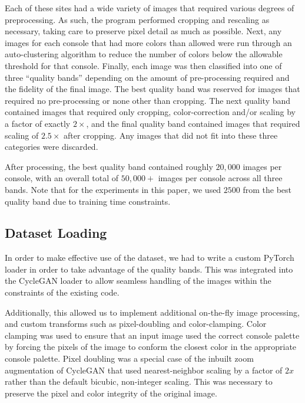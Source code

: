 \documentclass[10pt,twocolumn,letterpaper]{article}
\begin{document}
Each of these sites had a wide variety of images that required various degrees of preprocessing. As such, the program performed cropping and rescaling as necessary, taking care to preserve pixel detail as much as possible.
Next, any images for each console that had more colors than allowed were run through an auto-clustering algorithm to reduce the number of colors below the allowable threshold for that console.
Finally, each image was then classified into one of three ``quality bands'' depending on the amount of pre-processing required and the fidelity of the final image. The best quality band was reserved for images that required no pre-processing or none other than cropping. The next quality band contained images that  required only cropping, color-correction and/or scaling by a factor of exactly $2\times$, and the final quality band contained images that required scaling of $2.5\times$ after cropping. Any images that did not fit into these three categories were discarded.

After processing, the best quality band contained roughly $20,000$ images per console, with an overall total of $50,000+$ images per console across all three bands. Note that for the experiments in this paper, we used $2500$ from the best quality band due to training time constraints.

\subsection{Dataset Loading}
In order to make effective use of the dataset, we had to write a custom PyTorch loader in order to take advantage of the quality bands. This was integrated into the CycleGAN loader to allow seamless handling of the images within the constraints of the existing code.

Additionally, this allowed us to implement additional on-the-fly image processing, and custom transforms such as pixel-doubling and color-clamping. Color clamping was used to ensure that an input image used the correct console palette by forcing the pixels of the image to conform the closest color in the appropriate console palette.
Pixel doubling was a special case of the inbuilt zoom augmentation of CycleGAN that used nearest-neighbor scaling by a factor of $2x$ rather than the default bicubic, non-integer scaling. This was necessary to preserve the pixel and color integrity of the original image.
\end{document}
